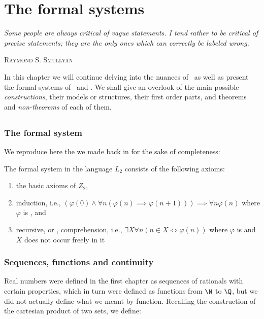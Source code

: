\documentclass[../main.tex]{memoir}
\begin{document}
\chapter{The formal systems}

\epigraph{
  \textit{
    Some people are always critical of vague statements. I tend rather to be
    critical of precise statements; they are the only ones which can correctly
    be labeled wrong.
  }
}{\textsc{Raymond S. Smullyan}}

In this chapter we will continue delving into the nuances of \rca\ as well as present the formal systems of \wkl\ and \aca. We shall give an overlook of the main possible \textit{constructions}, their models or structures, their first order parts, and theorems and \textit{non-theorems} of each of them.

\section{\rca}

\subsection{The formal system}

We reproduce here the  we made back in  for the sake of completeness:

\begin{definition}
  The formal system \rca in the language $L_2$ consists of the following axioms:

  \begin{enumerate}
  \item the basic axioms of $Z_2$,
  \item \re  induction, i.e., $(\varphi(0) \land \forall n (\varphi(n) \implies \varphi(n + 1))) \implies \forall n \varphi(n)$ where $\varphi$ is \re, and
  \item recursive, or \rec, comprehension, i.e., $\exists X \forall n (n \in X \iff \varphi(n))$ where $\varphi$ is \rec and $X$ does not occur freely in it
  \end{enumerate}
\end{definition}

\subsection{Sequences, functions and continuity}

Real numbers were defined in the first chapter as sequences of rationals with certain properties, which in turn were defined as functions from $\N$ to $\Q$, but we did not actually define what we meant by function. Recalling the construction of the cartesian product of two sets, we define:
\end{document}
